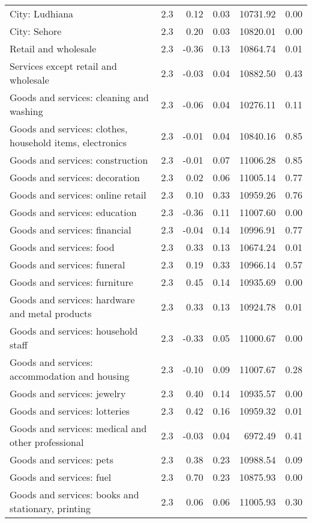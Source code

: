 \begin{longtable}{llrrrr}
  City: Ludhiana & 2.3 & 0.12 & 0.03 & 10731.92 & 0.00 \\ 
  City: Sehore & 2.3 & 0.20 & 0.03 & 10820.01 & 0.00 \\ 
  Retail and wholesale & 2.3 & -0.36 & 0.13 & 10864.74 & 0.01 \\ 
  Services except retail and wholesale & 2.3 & -0.03 & 0.04 & 10882.50 & 0.43 \\ 
  Goods and services: cleaning and washing & 2.3 & -0.06 & 0.04 & 10276.11 & 0.11 \\ 
  Goods and services: clothes, household items, electronics & 2.3 & -0.01 & 0.04 & 10840.16 & 0.85 \\ 
  Goods and services: construction & 2.3 & -0.01 & 0.07 & 11006.28 & 0.85 \\ 
  Goods and services: decoration & 2.3 & 0.02 & 0.06 & 11005.14 & 0.77 \\ 
  Goods and services: online retail & 2.3 & 0.10 & 0.33 & 10959.26 & 0.76 \\ 
  Goods and services: education & 2.3 & -0.36 & 0.11 & 11007.60 & 0.00 \\ 
  Goods and services: financial & 2.3 & -0.04 & 0.14 & 10996.91 & 0.77 \\ 
  Goods and services: food & 2.3 & 0.33 & 0.13 & 10674.24 & 0.01 \\ 
  Goods and services: funeral & 2.3 & 0.19 & 0.33 & 10966.14 & 0.57 \\ 
  Goods and services: furniture & 2.3 & 0.45 & 0.14 & 10935.69 & 0.00 \\ 
  Goods and services: hardware and metal products & 2.3 & 0.33 & 0.13 & 10924.78 & 0.01 \\ 
  Goods and services: household staff & 2.3 & -0.33 & 0.05 & 11000.67 & 0.00 \\ 
  Goods and services: accommodation and housing & 2.3 & -0.10 & 0.09 & 11007.67 & 0.28 \\ 
  Goods and services: jewelry & 2.3 & 0.40 & 0.14 & 10935.57 & 0.00 \\ 
  Goods and services: lotteries & 2.3 & 0.42 & 0.16 & 10959.32 & 0.01 \\ 
  Goods and services: medical and other professional & 2.3 & -0.03 & 0.04 & 6972.49 & 0.41 \\ 
  Goods and services: pets & 2.3 & 0.38 & 0.23 & 10988.54 & 0.09 \\ 
  Goods and services: fuel & 2.3 & 0.70 & 0.23 & 10875.93 & 0.00 \\ 
  Goods and services: books and stationary, printing & 2.3 & 0.06 & 0.06 & 11005.93 & 0.30 \\ 

\end{longtable}
